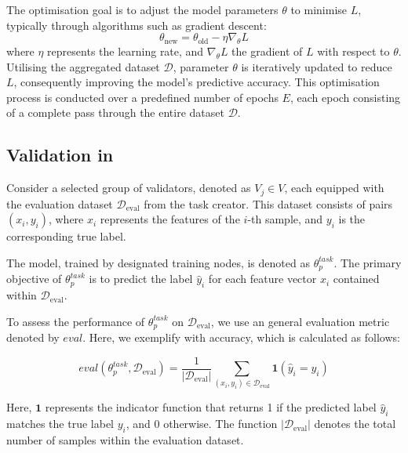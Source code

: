 \documentclass[conference]{IEEEtran}
\begin{document}
The optimisation goal is to adjust the model parameters \(\theta\) to minimise \(L\), typically through algorithms such as  gradient descent:
\begin{equation*}
\theta_{\text{new}} = \theta_{\text{old}} - \eta \nabla_\theta L
\end{equation*}
where \(\eta\) represents the learning rate, and \(\nabla_\theta L\) the gradient of \(L\) with respect to \(\theta\). Utilising the aggregated dataset \(\mathcal{D}\), parameter \(\theta\) is iteratively updated to reduce \(L\), consequently improving the model's predictive accuracy. This optimisation process is conducted over a predefined number of epochs \(E\), each epoch consisting of a complete pass through the entire dataset \(\mathcal{D}\).








\subsection{Validation in \SNT}

Consider a selected group of validators, denoted as $V_j \in V$, each equipped with the evaluation dataset $\mathcal{D}_{\text{eval}}$ from the task creator. This dataset consists of pairs $(x_i, y_i)$, where $x_i$ represents the features of the $i$-th sample, and $y_i$ is the corresponding true label. 

The model, trained by designated training nodes, is denoted as $\theta^{task}_p$. The primary objective of $\theta^{task}_p$ is to predict the label $\hat{y}_i$ for each feature vector $x_i$ contained within $\mathcal{D}_{\text{eval}}$. 

To assess the performance of $\theta^{task}_p$ on $\mathcal{D}_{\text{eval}}$, we use an general evaluation metric denoted by $eval$. Here, we exemplify with accuracy, which is calculated as follows:

\begin{equation*}
eval(\theta^{task}_p, \mathcal{D}_{\text{eval}}) = \frac{1}{|\mathcal{D}_{\text{eval}}|} \sum_{(x_i, y_i) \in \mathcal{D}_{\text{eval}}} \mathbf{1}(\hat{y}_i = y_i)
\end{equation*}

Here, $\mathbf{1}$ represents the indicator function that returns 1 if the predicted label $\hat{y}_i$ matches the true label $y_i$, and 0 otherwise. The function $|\mathcal{D}_{\text{eval}}|$ denotes the total number of samples within the evaluation dataset.
\end{document}
